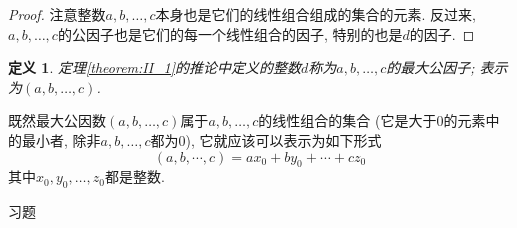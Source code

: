 \documentclass[12pt,a4paper]{book} %
\newtheorem{definition}[theorem]{定义}
\theoremstyle{remark}
\theoremstyle{example}
\theoremstyle{lemma}
\theoremstyle{corollary}
\numberwithin{theorem}{chapter}
\begin{document}
\begin{proof}
注意整数$a, b, \ldots, c$本身也是它们的线性组合组成的集合的元素. 反过来, $a, b, \ldots, c$的公因子也是它们的每一个线性组合的因子, 特别的也是$d$的因子.
\end{proof}

\begin{definition}
定理\ref{theorem:II_1}的推论中定义的整数$d$称为$a, b, \ldots, c$的最大公因子; 表示为$(a, b, \ldots, c)$.
\end{definition}

既然最大公因数$(a, b, \ldots, c)$属于$a, b, \ldots, c$的线性组合的集合 (它是大于0的元素中的最小者, 除非$a, b, \ldots, c$都为0), 它就应该可以表示为如下形式
\[
(a, b, \cdots, c) = ax_0 + by_0 + \cdots + cz_0
\]
其中$x_0, y_0, \ldots, z_0$都是整数.

习题
\end{document}
